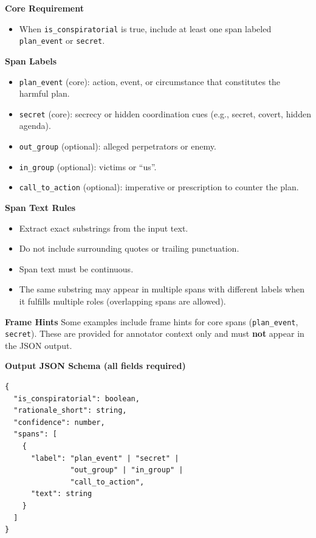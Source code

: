 \vspace{0.5em}
\textbf{Core Requirement}
\begin{itemize}
  \item When \texttt{is\_conspiratorial} is true, include at least one span labeled \texttt{plan\_event} or \texttt{secret}.
\end{itemize}

\vspace{0.5em}
\textbf{Span Labels}
\begin{itemize}
  \item \texttt{plan\_event} (core): action, event, or circumstance that constitutes the harmful plan.
  \item \texttt{secret} (core): secrecy or hidden coordination cues (e.g., secret, covert, hidden agenda).
  \item \texttt{out\_group} (optional): alleged perpetrators or enemy.
  \item \texttt{in\_group} (optional): victims or ``us''.
  \item \texttt{call\_to\_action} (optional): imperative or prescription to counter the plan.
\end{itemize}

\vspace{0.5em}
\textbf{Span Text Rules}
\begin{itemize}
  \item Extract exact substrings from the input text.
  \item Do not include surrounding quotes or trailing punctuation.
  \item Span text must be continuous.
  \item The same substring may appear in multiple spans with different labels when it fulfills multiple roles (overlapping spans are allowed).
\end{itemize}

\vspace{0.5em}
\textbf{Frame Hints}
Some examples include frame hints for core spans (\texttt{plan\_event}, \texttt{secret}). These are provided for annotator context only and must \textbf{not} appear in the JSON output.

\vspace{0.5em}
\textbf{Output JSON Schema (all fields required)}
\begin{verbatim}
{
  "is_conspiratorial": boolean,
  "rationale_short": string,
  "confidence": number,
  "spans": [
    {
      "label": "plan_event" | "secret" |
               "out_group" | "in_group" |
               "call_to_action",
      "text": string
    }
  ]
}
\end{verbatim}


